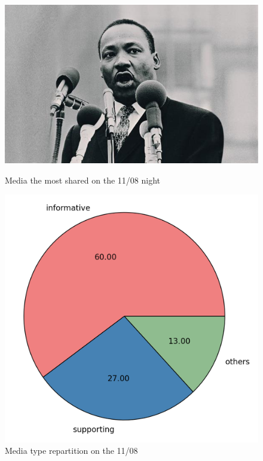 \documentclass[a4paper,twoside,12pt,openright]{report}
\begin{document}
\begin{figure}[H]
\begin{minipage}[t]{0.45\textwidth}
\begin{center}
	\includegraphics[width=\textwidth]{images/photos/mlk.jpg}
	\caption{Media the most shared on the 11/08 night}
\end{center}
\end{minipage}
\hfill
\begin{minipage}[t]{0.4\textwidth}
\begin{center}
	\includegraphics[width=\textwidth]{images/plots/pies/pie_medias.png}
	\caption{Media type repartition on the 11/08}
	\label{typeRepartitionMedias}
\end{center}
\end{minipage}
\end{figure}
\end{document}
